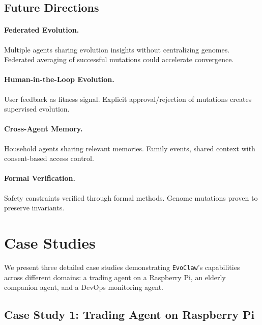 \documentclass{article}
\newcommand{\evoclaw}{\texttt{EvoClaw}\xspace}
\begin{document}
\subsection{Future Directions}

\paragraph{Federated Evolution.} Multiple agents sharing evolution insights without centralizing genomes. Federated averaging of successful mutations could accelerate convergence.

\paragraph{Human-in-the-Loop Evolution.} User feedback as fitness signal. Explicit approval/rejection of mutations creates supervised evolution.

\paragraph{Cross-Agent Memory.} Household agents sharing relevant memories. Family events, shared context with consent-based access control.

\paragraph{Formal Verification.} Safety constraints verified through formal methods. Genome mutations proven to preserve invariants.



\section{Case Studies}
\label{sec:casestudies}

We present three detailed case studies demonstrating \evoclaw{}'s capabilities across different domains: a trading agent on a Raspberry Pi, an elderly companion agent, and a DevOps monitoring agent.

\subsection{Case Study 1: Trading Agent on Raspberry Pi}
\end{document}
